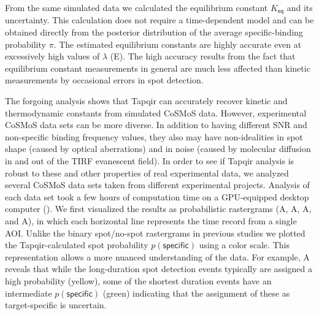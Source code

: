 From the same simulated data we calculated the equilibrium constant $K_\mathsf{eq}$ and its uncertainty. This calculation does not require a time-dependent model and can be obtained directly from the posterior distribution of the average specific-binding probability $\pi$. The estimated equilibrium constants are highly accurate even at excessively high values of $\lambda$ (E).  The high accuracy results from the fact that equilibrium constant measurements in general are much less affected than kinetic measurements by occasional errors in spot detection. 

The forgoing analysis shows that Tapqir can accurately recover kinetic and thermodynamic constants from simulated CoSMoS data.  However, experimental CoSMoS data sets can be more diverse.  In addition to having different SNR and non-specific binding frequency values, they also may have non-idealities in spot shape (caused by optical aberrations) and in noise (caused by molecular diffusion in and out of the TIRF evanescent field).  In order to see if Tapqir analysis is robust to these and other properties of real experimental data, we analyzed several CoSMoS data sets taken from different experimental projects. Analysis of each data set took a few hours of computation time on a GPU-equipped desktop computer (). We first visualized the results as probabilistic rastergrams (A, A, A, and A), in which each horizontal line represents the time record from a single AOI.  Unlike the binary spot/no-spot rastergrams in previous studies \citep{Friedman2013-sf,Rosen2020-zn} we plotted the Tapqir-calculated spot probability $p(\mathsf{specific})$ using a color scale.  This representation allows a more nuanced understanding of the data.  For example, A reveals that while the long-duration spot detection events typically are assigned a high probability (yellow), some of the shortest duration events have an intermediate $p(\mathsf{specific})$ (green) indicating that the assignment of these as target-specific is uncertain.  



